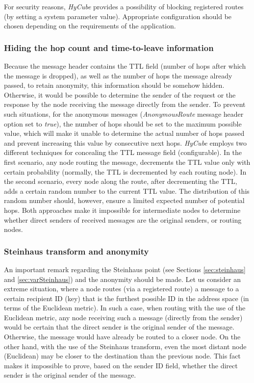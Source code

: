 For security reasons, \emph{HyCube} provides a possibility of blocking registered routes (by setting a system parameter value). Appropriate configuration should be chosen depending on the requirements of the application.




\subsubsection{Hiding the hop count and time-to-leave information}

Because the message header contains the TTL field (number of hops after which the message is dropped), as well as the number of hops the message already passed, to retain anonymity, this information should be somehow hidden. Otherwise, it would be possible to determine the sender of the request or the response by the node receiving the message directly from the sender. To prevent such situations, for the anonymous messages (\emph{AnonymousRoute} message header option set to \emph{true}), the number of hops should be set to the maximum possible value, which will make it unable to determine the actual number of hops passed and prevent increasing this value by consecutive next hops. \emph{HyCube} employs two different techniques for concealing the TTL message field (configurable). In the first scenario, any node routing the message, decrements the TTL value only with certain probability (normally, the TTL is decremented by each routing node). In the second scenario, every node along the route, after decrementing the TTL, adds a certain random number to the current TTL value. The distribution of this random number should, however, ensure a limited expected number of potential hops. Both approaches make it impossible for intermediate nodes to determine whether direct senders of received messages are the original senders, or routing nodes.





\subsubsection{Steinhaus transform and anonymity}

An important remark regarding the Steinhaus point (see Sections \ref{sec:steinhaus} and \ref{sec:varSteinhaus}) and the anonymity should be made. Let us consider an extreme situation, where a node routes (via a registered route) a message to a certain recipient ID (key) that is the furthest possible ID in the address space (in terms of the Euclidean metric). In such a case, when routing with the use of the Euclidean metric, any node receiving such a message (directly from the sender) would be certain that the direct sender is the original sender of the message. Otherwise, the message would have already be routed to a closer node. On the other hand, with the use of the Steinhaus transform, even the most distant node (Euclidean) may be closer to the destination than the previous node. This fact makes it impossible to prove, based on the sender ID field, whether the direct sender is the original sender of the message.

